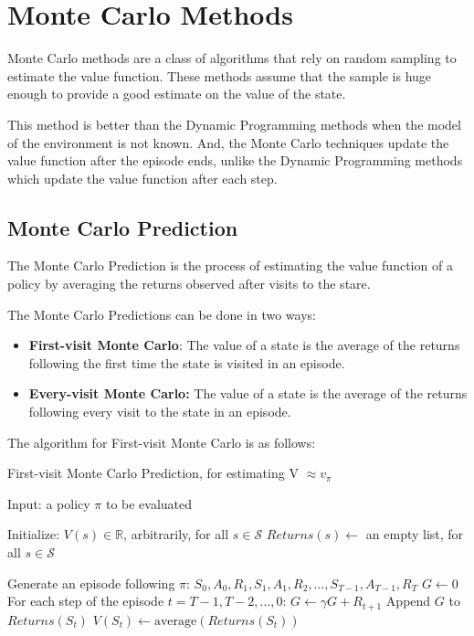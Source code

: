 \section{Monte Carlo Methods}

Monte Carlo methods are a class of algorithms that rely on random sampling to estimate the value function. These methods assume that the sample is huge enough to provide a good estimate on the value of the state.

This method is better than the Dynamic Programming methods when the model of the environment is not known. And, the Monte Carlo techniques update the value function after the episode ends, unlike the Dynamic Programming methods which update the value function after each step.

\subsection{Monte Carlo Prediction}

The Monte Carlo Prediction is the process of estimating the value function of a policy by averaging the returns observed after visits to the stare. 

The Monte Carlo Predictions can be done in two ways:
\begin{itemize}
    \item \textbf{First-visit Monte Carlo}: The value of a state is the average of the returns following the first time the state is visited in an episode.
    \item \textbf{Every-visit Monte Carlo:} The value of a state is the average of the returns following every visit to the state in an episode.
\end{itemize}

The algorithm for First-visit Monte Carlo is as follows:

\begin{algorithm}
    \caption{First-visit Monte Carlo Prediction, for estimating V $\approx v_\pi$}
    \begin{algorithmic}
        \State Input: a policy $\pi$ to be evaluated
    \end{algorithmic}
    \begin{algorithmic}
        \State Initialize:
        \State $V(s) \in \mathbb{R}$, arbitrarily, for all $s\in\mathcal{S}$
        \State $Returns(s) \leftarrow$ an empty list, for all $s\in\mathcal{S}$
    \end{algorithmic}
    \begin{algorithmic}
            \State Generate an episode following $\pi$: $S_0, A_0, R_1, S_1, A_1, R_2, \dots, S_{T-1}, A_{T-1}, R_T$
            \State $G \leftarrow 0$
            \State For each step of the episode $t=T-1, T-2, \dots, 0$:
            \State $G \leftarrow \gamma G + R_{t+1}$
                \State Append $G$ to $Returns(S_t)$
                \State $V(S_t) \leftarrow \text{average}(Returns(S_t))$
            \EndIf
        \EndWhile
    \end{algorithmic}
\end{algorithm}